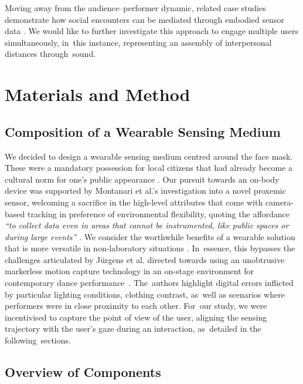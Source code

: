 Moving away from the audience--performer dynamic, related case studies demonstrate how social encounters can be mediated through embodied sensor data \citep{roo_physio-stacks_2020,howell_life-affirming_2019,ashford_eeg_2019}. We would like to further investigate this approach to engage multiple users simultaneously, in~this instance, representing an assembly of interpersonal distances through~sound.

\section{Materials and Method}
\label{sec3:method}

\subsection*{Composition of a Wearable Sensing Medium}
\label{sec3.1:tech_composition}

We decided to design a wearable sensing medium centred around the face mask. These were a mandatory possession for local citizens that had already become a cultural norm for one’s public appearance \citep{cdc_covid-19_2021}. Our pursuit towards an on-body device was supported by Montanari et al.'s %
investigation into a novel proxemic sensor, welcoming a sacrifice in the high-level attributes that come with camera-based tracking in preference of environmental flexibility, quoting the affordance \textit{``to collect data even in areas that cannot be instrumented, like public spaces or during large events''} \cite{montanari_measuring_2018}. We consider the worthwhile benefits of a wearable solution that is more versatile in non-laboratory situations  \citep{hale_are_2020,solberg_group_2019,hamilton_seeing_2018}. In~essence, this bypasses the challenges articulated by Jürgens et al. %
directed towards using an unobtrusive markerless motion capture technology in an on-stage environment for contemporary dance performance~\cite{jurgens_designing_2020}. The~authors highlight digital errors inflicted by particular lighting conditions, clothing contrast, as~well as scenarios where performers were in close proximity to each other. For~our study, we were incentivised to capture the point of view of the user, aligning the sensing trajectory with the user's gaze during an interaction, as~detailed in the following~sections.

\subsection*{Overview of Components}
\label{sec32}

